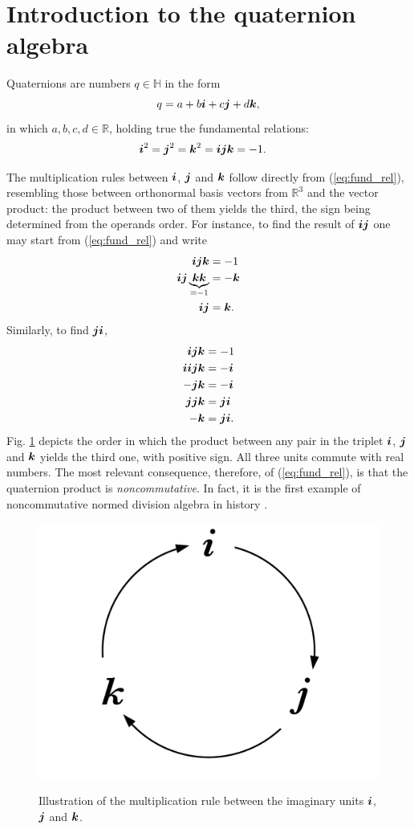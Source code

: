 \section{Introduction to the quaternion algebra}

Quaternions are numbers $q \in \mathbb{H}$ in the form
\begin{equation}
    q = a + b\boldsymbol{i} + c\boldsymbol{j} + d\boldsymbol{k},
    \label{eq:q}
\end{equation}
in which $a, b, c, d \in \mathbb{R}$, holding true the fundamental relations:
\begin{equation}
    \label{eq:fund_rel}
    \begin{aligned}
        \boldsymbol{i} ^2 = \boldsymbol{j}^2 & =\boldsymbol{k}^2 = \boldsymbol{i} \boldsymbol{j} \boldsymbol{k} = -1.
    \end{aligned}
\end{equation}

The multiplication rules between  $ \boldsymbol{i} $, $ \boldsymbol{j} $ and $ \boldsymbol{k} $ follow directly from (\ref{eq:fund_rel}), resembling those between orthonormal basis vectors from $ \mathbb{R}^3 $ and the vector product: the product between two of them yields the third, the sign being determined from the operands order. For instance, to find the result of $ \boldsymbol{i} \boldsymbol{j} $ one may start from (\ref{eq:fund_rel}) and write
\begin{equation}
    \begin{aligned}
        \boldsymbol{i} \boldsymbol{j} \boldsymbol{k}                         & = -1   \\
        \boldsymbol{i} \boldsymbol{j} \underbrace{\boldsymbol{k} \boldsymbol{k}}_{= -1} & = -\boldsymbol{k} \\
        \boldsymbol{i} \boldsymbol{j}                             & = \boldsymbol{k}.
    \end{aligned}
\end{equation}
Similarly, to find $ \boldsymbol{j} \boldsymbol{i} $,
\begin{equation}
    \begin{aligned}
        \boldsymbol{i} \boldsymbol{j} \boldsymbol{k}     & = -1        \\
        \boldsymbol{i} \boldsymbol{i} \boldsymbol{j} \boldsymbol{k} & = -\boldsymbol{i}      \\
        - \boldsymbol{j} \boldsymbol{k}       & = - \boldsymbol{i}     \\
        \boldsymbol{j} \boldsymbol{j} \boldsymbol{k}     & =  \boldsymbol{j} \boldsymbol{i}  \\
        - \boldsymbol{k}           & =  \boldsymbol{j} \boldsymbol{i}. \\
    \end{aligned}
\end{equation}
Fig. \ref{fig:quatmult} depicts the order in which the product between any pair in the triplet $ \boldsymbol{i} $, $ \boldsymbol{j} $ and $ \boldsymbol{k} $ yields the third one, with positive sign. All three units commute with real numbers. The most relevant consequence, therefore, of (\ref{eq:fund_rel}), is that the quaternion product is \textit{noncommutative}. In fact, it is the first example of noncommutative normed division algebra in history \cite{kleiner2007history}.

\begin{figure}
    \centering
    \caption{Illustration of the multiplication rule between the imaginary units $ \boldsymbol{i} $, $ \boldsymbol{j} $ and $ \boldsymbol{k} $.}
    \includegraphics[width=0.2\linewidth]{Figures/quaternion_multiplication.pdf}
    \floatsource
    \label{fig:quatmult}
\end{figure}
